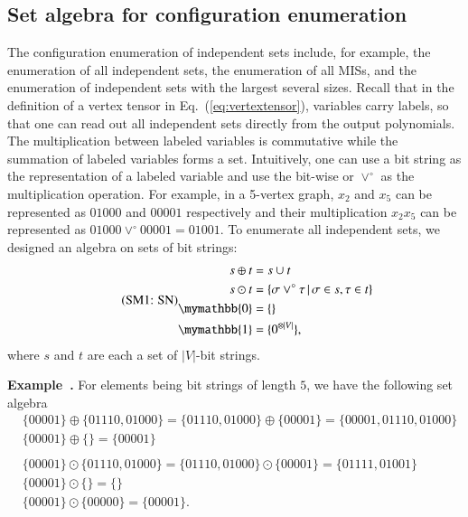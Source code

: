 \documentclass[onefignum, onetabnum]{siamart190516}
\newcommand{\eqname}[1]{\stepcounter{equation}\tag{\theequation : #1}}
\newcommand{\<}{\langle}
\renewcommand{\>}{\rangle}
\newcommand{\Eq}[1]{Eq.~(\ref{#1})}
\newcounter{example}
\newenvironment{example}[1][]{\refstepcounter{example}\par\medskip
   \noindent \textbf{Example~\theexample. #1} \rmfamily}{\medskip}
\begin{document}
\subsection{Set algebra for configuration enumeration}
The configuration enumeration of independent sets include, for example, the enumeration of all independent sets, the enumeration of all MISs, and the enumeration of independent sets with the largest several sizes.
Recall that in the definition of a vertex tensor in \Eq{eq:vertextensor}, variables carry labels, so that one can read out all independent sets directly from the output polynomials.
The multiplication between labeled variables is commutative while the summation of labeled variables forms a set.
Intuitively, one can use a bit string as the representation of a labeled variable and use the bit-wise or $\lor^\circ$ as the multiplication operation.
For example, in a 5-vertex graph, $x_2$ and $x_5$ can be represented as $01000$ and $00001$ respectively and their multiplication $x_2x_5$ can be represented as $01000 \lor^\circ 00001 = 01001$.
To enumerate all independent sets, we designed an algebra on sets of bit strings:
\begin{equation}
\eqname{SN}
\begin{split}
    s \oplus t &= s \cup t\\
    s \odot t &= \{\sigma \lor^\circ \tau \, | \, \sigma \in s, \tau \in t\}\\
    \mymathbb{0} &= \{\}\\
    \mymathbb{1} &= \{0^{\otimes |V|}\},
\end{split}\label{eq:set}
\end{equation}
where $s$ and $t$ are each a set of $|V|$-bit strings.
\begin{example}\label{eg:setalgebra}
    For elements being bit strings of length $5$, we have the following set algebra
\begin{equation*}
\begin{split}
    &\{00001\} \oplus \{01110, 01000\} = \{01110, 01000\} \oplus \{00001\} = \{00001,01110, 01000\}\\
    &\{00001\} \oplus \{\} = \{00001\}\\
&\\
    &\{00001\} \odot \{01110, 01000\} = \{01110, 01000\} \odot \{00001\} = \{01111, 01001\}\\
    &\{00001\} \odot \{\} = \{\}\\
    &\{00001\} \odot \{00000\} = \{00001\}.
\end{split}
\end{equation*}
\end{example}
\end{document}
